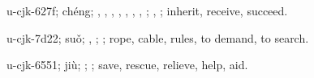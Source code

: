 \begin{multicols}{2}
{\cjkgGlue{}u-cjk-627f; chéng; \cjkgGlue{}\cjkgGlue{}\cjkgGlue{}, \cjkgGlue{}\cjkgGlue{}\cjkgGlue{}, \cjkgGlue{}\cjkgGlue{}\cjkgGlue{}, \cjkgGlue{}\cjkgGlue{}\cjkgGlue{}, \cjkgGlue{}\cjkgGlue{}\cjkgGlue{}, \cjkgGlue{}\cjkgGlue{}\cjkgGlue{}, \cjkgGlue{}\cjkgGlue{}\cjkgGlue{}, \cjkgGlue{}\cjkgGlue{}\cjkgGlue{}; \cjkgGlue{}, \cjkgGlue{}; inherit, receive, succeed.

\cjkgGlue{}u-cjk-7d22; suǒ; \cjkgGlue{}, \cjkgGlue{}; \cjkgGlue{}; rope, cable, rules, to demand, to search.

\cjkgGlue{}u-cjk-6551; jiù; \cjkgGlue{}\cjkgGlue{}\cjkgGlue{}; \cjkgGlue{}; save, rescue, relieve, help, aid.

}
\end{multicols}
